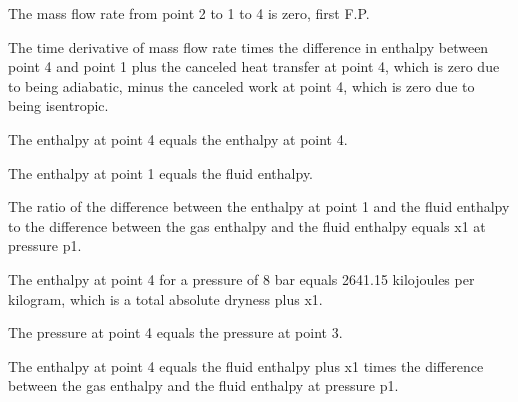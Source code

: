 The mass flow rate from point 2 to 1 to 4 is zero, first F.P.

The time derivative of mass flow rate times the difference in enthalpy between point 4 and point 1 plus the canceled heat transfer at point 4, which is zero due to being adiabatic, minus the canceled work at point 4, which is zero due to being isentropic.

The enthalpy at point 4 equals the enthalpy at point 4.

The enthalpy at point 1 equals the fluid enthalpy.

The ratio of the difference between the enthalpy at point 1 and the fluid enthalpy to the difference between the gas enthalpy and the fluid enthalpy equals x1 at pressure p1.

The enthalpy at point 4 for a pressure of 8 bar equals 2641.15 kilojoules per kilogram, which is a total absolute dryness plus x1.

The pressure at point 4 equals the pressure at point 3.

The enthalpy at point 4 equals the fluid enthalpy plus x1 times the difference between the gas enthalpy and the fluid enthalpy at pressure p1.